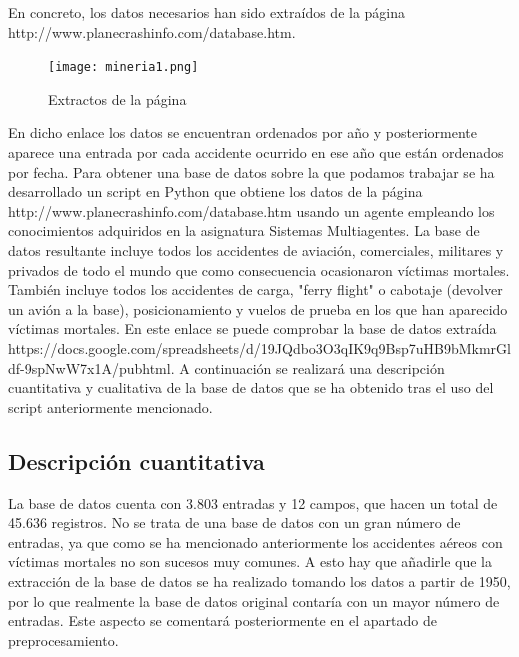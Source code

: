 \documentclass[a4paper,10pt]{article}
\begin{document}
\singlespacing
En concreto, los datos necesarios han sido extra\'idos de la p\'agina http://www.planecrashinfo.com/database.htm.

        \begin{figure}[h]
        	\centering
    \texttt{[image: mineria1.png]}
    \caption{Extractos de la p\'agina}
    \label{fig:inicio}
        \end{figure}
\pagebreak
En dicho enlace los datos se encuentran ordenados por a\~no y posteriormente aparece una entrada por cada accidente ocurrido en ese a\~no que est\'an ordenados por fecha. Para obtener una base de datos sobre la que podamos trabajar se ha desarrollado un script en Python que obtiene los datos de la p\'agina  http://www.planecrashinfo.com/database.htm usando un agente empleando los conocimientos adquiridos en la asignatura Sistemas Multiagentes.
\singlespacing
	La base de datos resultante incluye todos los accidentes de aviaci\'on, comerciales, militares y privados de todo el mundo que como consecuencia ocasionaron v\'ictimas mortales. Tambi\'en incluye todos los accidentes de carga, "ferry flight" o cabotaje (devolver un avi\'on a la base), posicionamiento y vuelos de prueba en los que han aparecido v\'ictimas mortales.
\singlespacing
	En este enlace se puede comprobar la base de datos extra\'ida
    https://docs.google.com/spreadsheets/d/19JQdbo3O3qIK9q9Bsp7uHB9bMkmrGldf-9spNwW7x1A/pubhtml.
    \singlespacing
    A continuaci\'on se realizar\'a una descripci\'on cuantitativa y cualitativa de la base de datos que se ha obtenido tras el uso del script anteriormente mencionado.

\subsection{Descripci\'on cuantitativa}
La base de datos cuenta con 3.803 entradas y 12 campos, que hacen un total de 45.636 registros.
 \singlespacing
	No se trata de una base de datos con un gran n\'umero de entradas, ya que como se ha mencionado anteriormente los accidentes a\'ereos con v\'ictimas mortales no son sucesos muy comunes. A esto hay que a\~nadirle que la extracci\'on de la base de datos se ha realizado tomando los datos a partir de 1950, por lo que realmente la base de datos original contar\'ia con un mayor n\'umero de entradas. Este aspecto se comentar\'a posteriormente en el apartado de preprocesamiento.
\end{document}
